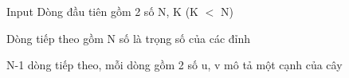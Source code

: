 Input
Dòng đầu tiên gồm 2 số N, K (K $<$ N)  

   Dòng tiếp theo gồm N số là trọng số của các đỉnh  

   N-1 dòng tiếp theo, mỗi dòng gồm 2 số u, v mô tả một cạnh của cây